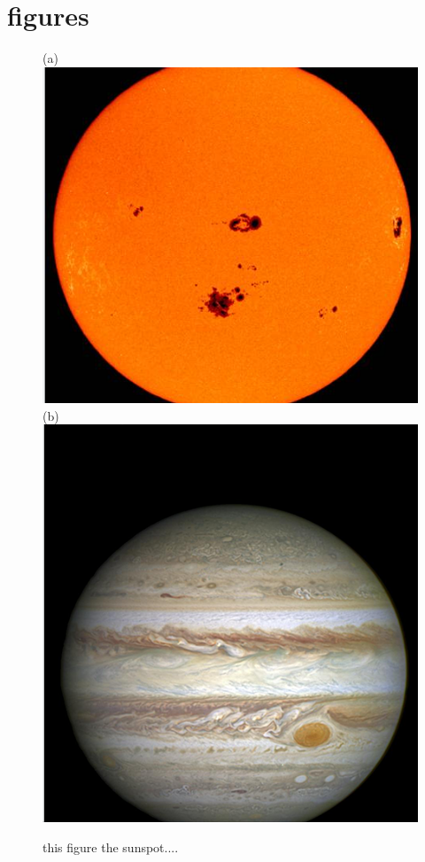 \documentclass{article}
\begin{document}
\section{figures}
\begin{figure}[h]
    \centering
   (a) \includegraphics[scale=0.45]{sun1.png}
   (b) \includegraphics[scale=0.4]{jup1.png}
    \caption{this figure the sunspot....}
    \label{fig:1}
\end{figure}
\end{document}
